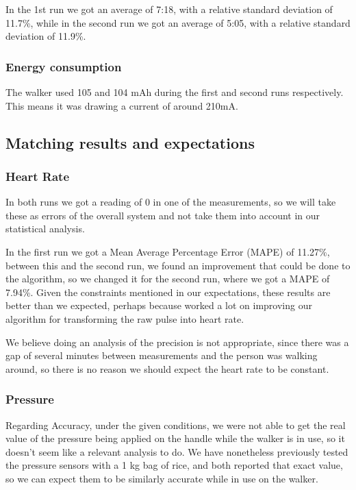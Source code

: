 			In the 1st run we got an average of 7:18, with a relative standard deviation of 11.7\%, while in the second run we got an average of 5:05, with a relative standard deviation of 11.9\%.

		\subsubsection{Energy consumption}
			The walker used 105 and 104 mAh during the first and second runs respectively. This means it was drawing a current of around 210mA.

	\subsection{Matching results and expectations}
		\subsubsection{Heart Rate}
			In both runs we got a reading of 0 in one of the measurements, so we will take these as errors of the overall system and not take them into account in our statistical analysis.

			In the first run we got a Mean Average Percentage Error (MAPE) of 11.27\%, between this and the second run, we found an improvement that could be done to the algorithm, so we changed it for the second run, where we got a MAPE of 7.94\%. Given the constraints mentioned in our expectations, these results are better than we expected, perhaps because worked a lot on improving our algorithm for transforming the raw pulse into heart rate.

			We believe doing an analysis of the precision is not appropriate, since there was a gap of several minutes between measurements and the person was walking around, so there is no reason we should expect the heart rate to be constant.

		\subsubsection{Pressure}
			Regarding Accuracy, under the given conditions, we were not able to get the real value of the pressure being applied on the handle while the walker is in use, so it doesn't seem like a relevant analysis to do. We have nonetheless previously tested the pressure sensors with a 1 kg bag of rice, and both reported that exact value, so we can expect them to be similarly accurate while in use on the walker.

